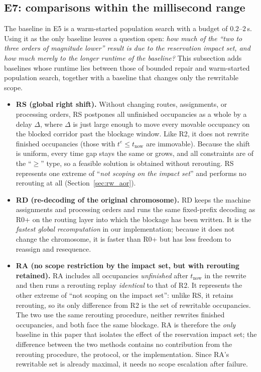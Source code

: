 \subsection{E7: comparisons within the millisecond range}
\label{sec:cheap}

The baseline in E5 is a warm-started population search with a budget of \(0.2\)--\(2\)\,s. Using it as the only baseline leaves a question open:
\emph{how much of the ``two to three orders of magnitude lower'' result is due to the reservation impact set, and how much merely to the longer runtime of the baseline?}
This subsection adds baselines whose runtime lies between those of bounded repair and warm-started population search, together with a baseline that changes only the rewritable scope.

\begin{itemize}[leftmargin=1.5em,itemsep=0.25em]
\item \textbf{RS (global right shift).} Without changing routes, assignments, or processing orders, RS postpones all unfinished occupancies as a whole
by a delay \(\Delta\), where \(\Delta\) is just large enough to move every movable occupancy on the blocked corridor past the blockage window.
Like R2, it does not rewrite finished occupancies (those with \(t^e\le t_{\mathrm{now}}\) are immovable).
Because the shift is uniform, every time gap stays the same or grows, and all constraints are of the ``\(\ge\)'' type,
so a feasible solution is obtained without rerouting. RS represents one extreme of ``\emph{not scoping on the impact set}'' and performs no rerouting at all
(Section~\ref{sec:rw_aor}).
\item \textbf{RD (re-decoding of the original chromosome).} RD keeps the machine assignments and processing orders and runs the same fixed-prefix decoding as R0+
on the routing layer into which the blockage has been written. It is the \emph{fastest global recomputation} in our implementation; because it does not change the chromosome, it is faster than R0+
but has less freedom to reassign and resequence.
\item \textbf{RA (no scope restriction by the impact set, but with rerouting retained).} RA includes all occupancies \emph{unfinished} after \(t_{\mathrm{now}}\) in the rewrite
and then runs a rerouting replay \emph{identical} to that of R2. It represents the other extreme of ``not scoping on the impact set'': unlike RS, it retains
rerouting, so its only difference from R2 is the set of rewritable occupancies. The two use the same rerouting procedure, neither rewrites finished occupancies, and both face the same blockage.
RA is therefore the \emph{only} baseline in this paper that isolates the effect of the reservation impact set; the difference between the two methods contains no contribution from the rerouting procedure, the protocol, or the implementation.
Since RA's rewritable set is already maximal, it needs no scope escalation after failure.
\end{itemize}

